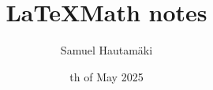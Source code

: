 \documentclass{article}
\title{\LaTeX Math notes}
\author{Samuel Hautamäki}
\date{th of May 2025}
\begin{document}
  \maketitle
   
  \section{}
  
  
  

   
\end{document}
